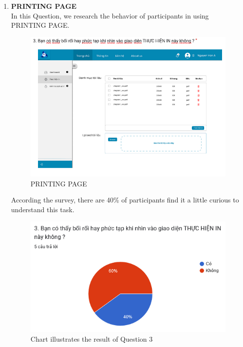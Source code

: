\begin{enumerate}
    \item \textbf{PRINTING PAGE} \\
    In this Question, we research the behavior of participants in using PRINTING PAGE.
\begin{figure}[!h]
    \centering
    \includegraphics[width=0.8\linewidth]{images/image_uasbility/Q3_Stu.png}
    \caption{PRINTING PAGE}
    \label{fig:PRINTING PAGE}
\end{figure}
\newpage
According the survey, there are 40\% of participants find it a little curious to understand this task.
\begin{figure}[!h]
    \centering
    \includegraphics[width=0.8\linewidth]{images/image_uasbility/A3_Stu.png}
    \caption{Chart illustrates the result of Question 3}
    \label{fig:Chart illustrates the result of Question 3}
\end{figure}


\end{enumerate}
